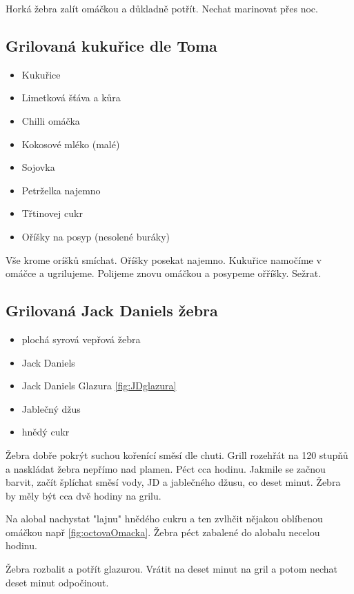 \documentclass[10pt,a4paper]{article}
\newenvironment{myitemize}
{ \begin{itemize}
    \setlength{\itemsep}{0pt}
    \setlength{\parskip}{0pt}
    \setlength{\parsep}{0pt}     }
{ \end{itemize}                  }
\begin{document}
Horká žebra zalít omáčkou a důkladně potřít. Nechat marinovat přes noc.
\subsection{Grilovaná kukuřice dle Toma}
\begin{minipage}[t]{0,5\textwidth}
\begin{myitemize} 
\item Kukuřice
\item Limetková šťáva a kůra
\item Chilli omáčka
\item Kokosové mléko (malé)
\item Sojovka
\item Petrželka najemno
\item Třtinovej cukr
\item Oříšky na posyp (nesolené buráky) 
\end{myitemize}
\end{minipage}
\begin{minipage}[t]{0,5\textwidth}
Vše krome oríšků smíchat. Oříšky posekat najemno. Kukuřice namočíme v omáčce a ugrilujeme. Polijeme znovu omáčkou a posypeme ořříšky. Sežrat.
\end{minipage}
\subsection{Grilovaná Jack Daniels žebra}
\begin{minipage}[t]{0,5\textwidth}
\begin{myitemize} 
\item plochá syrová vepřová žebra
\item Jack Daniels
\item Jack Daniels Glazura \ref{fig:JDglazura}
\item Jablečný džus
\item hnědý cukr
\end{myitemize}
\end{minipage}
\begin{minipage}[t]{0,5\textwidth}
Žebra dobře pokrýt suchou kořenící směsí dle chuti. Grill rozehřát na 120 stupňů a naskládat žebra nepřímo nad plamen. Péct cca hodinu. Jakmile se začnou barvit, začít šplíchat směsí vody, JD a jablečného džusu, co deset minut. Žebra by měly být cca dvě hodiny na grilu. 

Na alobal nachystat "lajnu" hnědého cukru a ten zvlhčit nějakou oblíbenou omáčkou např \ref{fig:octovaOmacka}. Žebra péct zabalené do alobalu necelou hodinu.

Žebra rozbalit a potřít glazurou. Vrátit na deset minut na gril a potom nechat deset minut odpočinout.
\end{minipage}
\pagebreak
\end{document}
